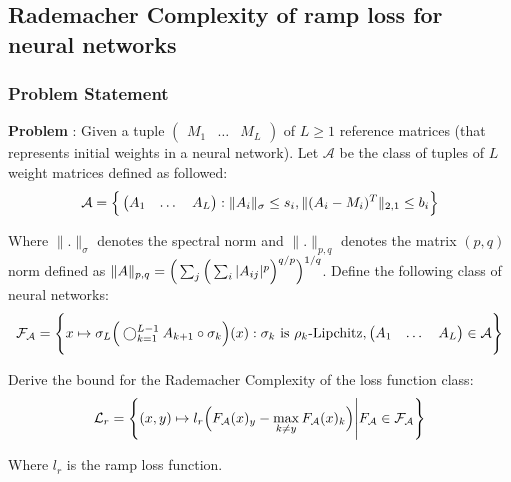 \newpage
\subsection{Rademacher Complexity of ramp loss for neural networks}
\subsubsection{Problem Statement}
\textbf{Problem} : Given a tuple $\begin{pmatrix}M_1 & \dots & M_L\end{pmatrix}$ of $L\ge 1$ reference matrices (that represents initial weights in a neural network). Let $\mathcal{A}$ be the class of tuples of $L$ weight matrices defined as followed:
\begin{align*}
    \mathcal{A} = \Big\{ 
        \begin{pmatrix}
            A_1 & \dots & A_L
        \end{pmatrix} : \|A_i\|_\sigma \le s_i, \|(A_i - M_i)^T\|_{2, 1}\le b_i
     \Big\}
\end{align*}

\noindent Where $\|.\|_\sigma$ denotes the spectral norm and $\|.\|_{p, q}$ denotes the matrix $(p, q)$ norm defined as $\|A\|_{p, q} = \Big( \sum_j\Big( \sum_{i}|A_{ij}|^p \Big)^{q/p} \Big)^{1/q}$. Define the following class of neural networks:
\begin{align*}
    \mathcal{F}_\mathcal{A} = \Bigg\{ 
        x\mapsto \sigma_L \Big( 
            \bigcirc_{k=1}^{L-1} A_{k+1} \circ \sigma_k
         \Big)(x) : \sigma_k \text{ is } \rho_k\text{-Lipchitz}, \begin{pmatrix}
            A_1 & \dots & A_L
        \end{pmatrix} \in \mathcal{A}
     \Bigg\}
\end{align*}

\noindent Derive the bound for the Rademacher Complexity of the loss function class:
\begin{align*}
    \mathcal{L}_r = \Bigg\{ 
        (x, y) \mapsto l_r\Big( 
            F_\mathcal{A}(x)_y - \max_{k\ne y}F_\mathcal{A}(x)_k
         \Big) \Bigg| F_\mathcal{A} \in \mathcal{F}_\mathcal{A}
     \Bigg\}
\end{align*}

\noindent Where $l_r$ is the ramp loss function.
